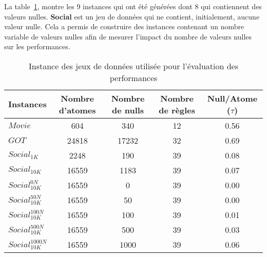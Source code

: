 La table~\ref{table:update:xp:datasets}, montre les 9 instances qui ont été générées dont 8 qui contiennent des valeurs nulles.
\textbf{Social} est un jeu de données qui ne contient, initialement, aucune valeur nulle.
Cela a permis de construire des instances contenant un nombre variable de valeurs nulles afin de mesurer l'impact du nombre de valeurs nulles sur les performances.

\begin{table}[htb]
    \centering
    \begin{tabular}{l|c|c|c|c}
        Instances              & Nombre d'atomes & Nombre de nulls & Nombre de règles & Null/Atome ($\tau$) \\
        \hline
        \hline
        $Movie$                & \num{604}       & \num{340}       & \num{12}         & \num{0.56}          \\
        $GOT$                  & \num{24818}     & \num{17232}     & \num{32}         & \num{0.69}          \\
        \hline
        $Social_{1K}$          & \num{2248}      & \num{190}       & \num{39}         & \num{0.08}          \\
        $Social_{10K}$         & \num{16559}     & \num{1183}      & \num{39}         & \num{0.07}          \\
        \hline
        $Social_{10K}^{0N}$    & \num{16559}     & \num{0}         & \num{39}         & \num{0.00}          \\
        $Social_{10K}^{50N}$   & \num{16559}     & \num{50}        & \num{39}         & \num{0.00}          \\
        $Social_{10K}^{100N}$  & \num{16559}     & \num{100}       & \num{39}         & \num{0.01}          \\
        $Social_{10K}^{500N}$  & \num{16559}     & \num{500}       & \num{39}         & \num{0.03}          \\
        $Social_{10K}^{1000N}$ & \num{16559}     & \num{1000}      & \num{39}         & \num{0.06}          \\
    \end{tabular}
    \caption{Instance des jeux de données utilisée pour l'évaluation des performances}
    \label{table:update:xp:datasets}
\end{table}

